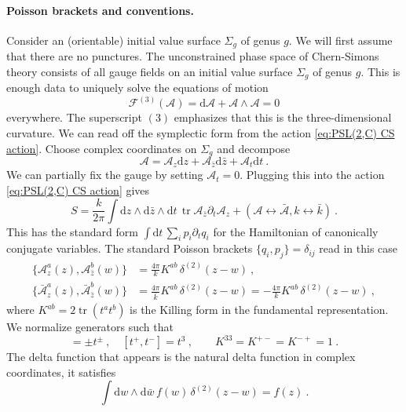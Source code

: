 \documentclass[12pt,a4paper]{article}
\newcommand{\be}{\begin{equation}}
\newcommand{\ee}{\end{equation}}
\DeclareMathOperator\tr{tr}
\renewcommand\d{\text{d}}
\begin{document}
\paragraph{Poisson brackets and conventions.} Consider an (orientable) initial value surface $\Sigma_g$ of genus $g$. We will first assume that there are no punctures.
The unconstrained phase space of Chern-Simons theory consists of all gauge fields on an initial value surface $\Sigma_g$ of genus $g$. This is enough data to uniquely solve the equations of motion
\be 
\mathcal{F}^{(3)}(\mathcal{A})=\d \mathcal{A}+\mathcal{A} \wedge \mathcal{A}=0 \label{eq:flatness 3d}
\ee
everywhere. The superscript $(3)$ emphasizes that this is the three-dimensional curvature. 
We can read off the symplectic form from the action \eqref{eq:PSL(2,C) CS action}. Choose complex coordinates on $\Sigma_g$ and decompose
\be 
\mathcal{A}=\mathcal{A}_z \d z + \mathcal{A}_{\bar{z}}
 \d \bar{z}+\mathcal{A}_t \d t~ .
 \ee
We can partially fix the gauge by setting $\mathcal{A}_t=0$. Plugging this into the action \eqref{eq:PSL(2,C) CS action} gives
\be 
S=\frac{k}{2\pi} \int \d z \wedge \d \bar{z} \wedge \d t\, \tr \mathcal{A}_{\bar{z}} \partial_t \mathcal{A}_z+(\mathcal{A} \leftrightarrow \bar{\mathcal{A}}, k \leftrightarrow \bar{k})~.
\ee
This has the standard form $\int \d t\, \sum_i p_i \partial_t q_i$ for the Hamiltonian of canonically conjugate variables. The standard Poisson brackets $\{q_i,p_j\}=\delta_{ij}$ read in this case
\begin{subequations}
\begin{align} 
\{\mathcal{A}_z^a(z), \mathcal{A}_{\bar{z}}^b(w)\}&=\frac{4\pi}{k} K^{ab}\, \delta^{(2)}(z-w)~, \\
\{\bar{\mathcal{A}}_z^a(z), \bar{\mathcal{A}}_{\bar{z}}^b(w)\}&=\frac{4\pi}{\bar{k}} K^{ab}\, \delta^{(2)}(z-w)=-\frac{4\pi}{k} K^{ab}\, \delta^{(2)}(z-w)~,
\end{align} \label{eq:SL(2,C) Poisson brackets}%
\end{subequations}
where $K^{ab}=2\tr(t^a t^b)$ is the Killing form in the fundamental representation. We normalize generators such that
\be 
[t^3,t^\pm]=\pm t^\pm~, \quad [t^+,t^-]=t^3~, \qquad K^{33}=K^{+-}=K^{-+}=1~. \label{eq:sl2C structure constants and Killing form}
\ee
The delta function that appears is the natural delta function in complex coordinates, it satisfies
\be 
\int \d w \wedge \d \bar{w}\, f(w) \, \delta^{(2)}(z-w)=f(z)~ .
\ee
\end{document}
